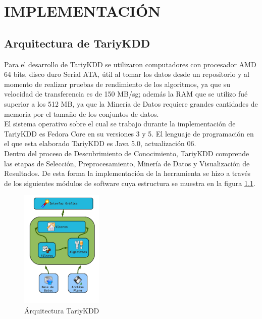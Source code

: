 \chapter{IMPLEMENTACI\'ON}
\section{Arquitectura de TariyKDD}
Para el desarrollo de TariyKDD se utilizaron computadores con procesador AMD 64 bits, disco duro Serial ATA,
\'util  al tomar los datos desde un repositorio y al momento de realizar pruebas de rendimiento de los
algoritmos, ya que su velocidad de transferencia es de 150 MB/sg; adem\'as la RAM que se utilizo fu\'e
superior a los 512 MB, ya que la Miner\'ia de Datos requiere grandes cantidades de memoria por el tama\~no de
los conjuntos de datos.\\

El sistema operativo sobre el cual se trabajo durante la implementaci\'on de TariyKDD es Fedora Core en su
versiones 3 y 5. El lenguaje de programaci\'on en el que esta elaborado TariyKDD es Java 5.0, 
actualizaci\'on 06.\\

Dentro del proceso de Descubrimiento de Conocimiento, TariyKDD comprende las etapas de Selecci\'on,
Preprocesamiento, Miner\'ia de Datos y Visualizaci\'on de Resultados. De esta forma la implementaci\'on de la
herramienta se hizo a trav\'es de los siguientes m\'odulos de software cuya estructura se muestra en la figura
\ref{arquitectura}.

\begin{figure}[!ht]
\centering
\includegraphics[width=0.35\textwidth]{images/arquitectura.png}
\caption{\'Arquitectura TariyKDD}
\label{arquitectura}
\end{figure}

